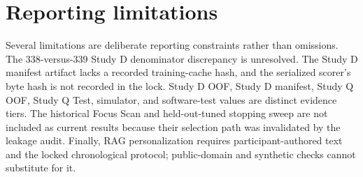 \documentclass[final,5p,times,twocolumn,authoryear]{elsarticle}
\begin{document}
\section{Reporting limitations}
Several limitations are deliberate reporting constraints rather than omissions. The 338-versus-339 Study D denominator discrepancy is unresolved. The Study D manifest artifact lacks a recorded training-cache hash, and the serialized scorer's byte hash is not recorded in the lock. Study D OOF, Study D manifest, Study Q OOF, Study Q Test, simulator, and software-test values are distinct evidence tiers. The historical Focus Scan and held-out-tuned stopping sweep are not included as current results because their selection path was invalidated by the leakage audit. Finally, RAG personalization requires participant-authored text and the locked chronological protocol; public-domain and synthetic checks cannot substitute for it.



\end{document}
